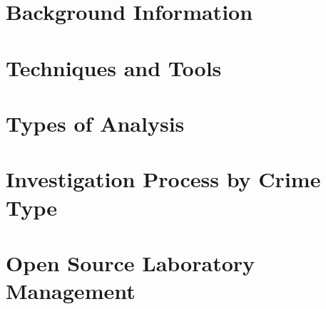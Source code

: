 \documentclass[12pt,a4paper]{book}
\begin{document}
\part{Background Information}

\part{Techniques and Tools}
\part{Types of Analysis}
\part{Investigation Process by Crime Type}
\part{Open Source Laboratory Management}


\backmatter
\end{document}
